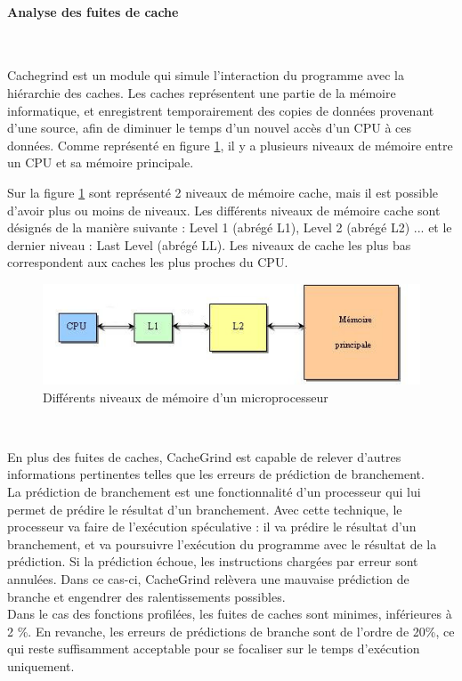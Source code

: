 \documentclass[10pt]{report}
\begin{document}
\paragraph{Analyse des fuites de cache}~\par
Cachegrind est un module qui simule l'interaction du programme avec la hiérarchie des caches. Les caches représentent une partie de la mémoire informatique, et enregistrent temporairement des copies de données provenant d'une source, afin de diminuer le temps d'un nouvel accès d'un CPU à ces données. Comme représenté en figure \ref{Différents niveaux de mémoire d'un microprocesseur}, il y a plusieurs niveaux de mémoire entre un CPU et sa mémoire principale. 

Sur la figure \ref{Différents niveaux de mémoire d'un microprocesseur} sont représenté 2 niveaux de mémoire cache, mais il est possible d'avoir plus ou moins de niveaux.
Les différents niveaux de mémoire cache sont désignés de la manière suivante : Level 1 (abrégé L1), Level 2 (abrégé L2) ... et le dernier niveau : Last Level (abrégé LL). Les niveaux de cache les plus bas correspondent aux caches les plus proches du CPU. 
\begin{figure}[h!]
	\begin{center}
		\includegraphics[width=13cm]{Reports/figures/Mem_hierarchy.jpg}
	\end{center}	
	\caption{Différents niveaux de mémoire d'un microprocesseur}
	\label{Différents niveaux de mémoire d'un microprocesseur}
\end{figure}~\par 
En plus des fuites de caches, CacheGrind est capable de relever d'autres informations pertinentes telles que les erreurs de prédiction de branchement.\\
La prédiction de branchement est une fonctionnalité d'un processeur qui lui permet de prédire le résultat d'un branchement. Avec cette technique, le processeur va faire de l’exécution spéculative : il va prédire le résultat d'un branchement, et va poursuivre l’exécution du programme avec le résultat de la prédiction. Si la prédiction échoue, les instructions chargées par erreur sont annulées. Dans ce cas-ci, CacheGrind relèvera une mauvaise prédiction de branche et engendrer des ralentissements possibles.\\
Dans le cas des fonctions profilées, les fuites de caches sont minimes, inférieures à 2 \%. En revanche, les erreurs de prédictions de branche sont de l'ordre de 20\%, ce qui reste suffisamment acceptable pour se focaliser sur le temps d'exécution uniquement.  
	
\end{document}
